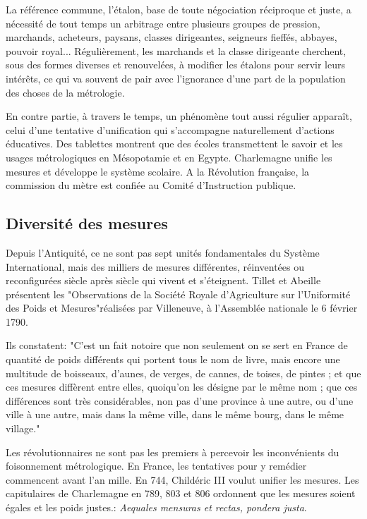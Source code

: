 \documentclass[main.tex]{subfiles}
\begin{document}
La référence commune, l'étalon, base de toute négociation réciproque et juste, a nécessité de tout temps un arbitrage entre plusieurs groupes de pression, marchands, acheteurs, paysans, classes dirigeantes, seigneurs fieffés, abbayes, pouvoir royal...  Régulièrement, les marchands et la classe dirigeante cherchent, sous des formes diverses et renouvelées, à modifier les étalons pour servir leurs intérêts, ce qui va souvent de pair avec l'ignorance d'une part de la population des choses de la métrologie.

En contre partie, à travers le temps, un phénomène tout aussi régulier apparaît, celui d'une tentative d'unification qui s'accompagne naturellement d'actions éducatives.  Des tablettes montrent que des écoles transmettent le savoir et les usages métrologiques en Mésopotamie et en Egypte.  Charlemagne unifie les mesures et développe le système scolaire.  A la Révolution française, la commission du mètre est confiée au Comité d'Instruction publique.

\subsection{Diversité des mesures}

Depuis l'Antiquité, ce ne sont pas sept unités fondamentales du Système International, mais des milliers de mesures différentes, réinventées ou reconfigurées siècle après siècle qui vivent et s'éteignent. Tillet et Abeille présentent les "Observations de la Société Royale d'Agriculture sur l'Uniformité des Poids et Mesures"réalisées par Villeneuve, à l'Assemblée nationale le 6 février 1790.

Ils constatent: "C'est un fait notoire que non seulement on se sert en France de quantité de poids différents qui portent tous le nom de livre, mais encore une multitude de boisseaux, d'aunes, de verges, de cannes, de toises, de pintes ; et que ces mesures diffèrent entre elles, quoiqu'on les désigne par le même nom ; que ces différences sont très considérables, non pas d'une province à une autre, ou d'une ville à une autre, mais dans la même ville, dans le même bourg, dans le même village."

Les révolutionnaires ne sont pas les premiers à percevoir les inconvénients du foisonnement métrologique.  En France, les tentatives pour y remédier commencent avant l'an mille.  En 744, Childéric III voulut unifier les mesures.  Les capitulaires de Charlemagne en 789, 803 et 806 ordonnent que les mesures soient égales et les poids justes.: \textit{Aequales mensuras et rectas, pondera justa}.
\end{document}
